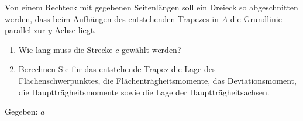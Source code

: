 \documentclass{exercise}
\begin{document}
    \begin{problem}
        Von einem Rechteck mit gegebenen Seitenlängen soll ein Dreieck so abgeschnitten werden, dass beim Aufhängen des entstehenden Trapezes in \(A\) die Grundlinie parallel zur \(\bar{y}\)-Achse liegt.
        \begin{enumerate}
            \item Wie lang muss die Strecke \(c\) gewählt werden?
            \item Berechnen Sie für das entstehende Trapez die Lage des Flächenschwerpunktes, die Flächenträgheitsmomente, das Deviationsmoment, die Hauptträgheitsmomente sowie die Lage der Hauptträgheitsachsen.
        \end{enumerate}
        \begin{center}
        \end{center}
        Gegeben: \(a\)
    \end{problem}
\end{document}
